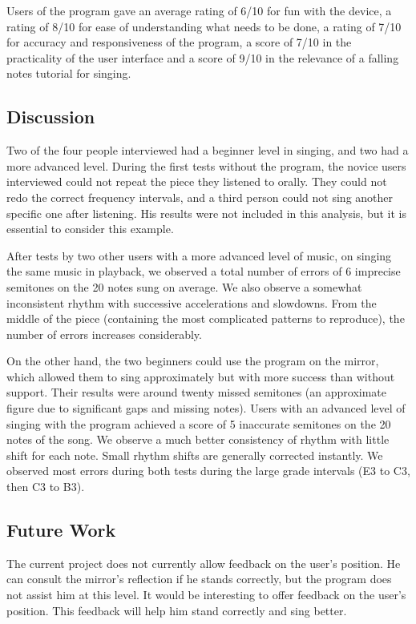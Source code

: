 Users of the program gave an average rating of 6/10 for fun with the device, a rating of 8/10 for ease of understanding what needs to be done, a rating of 7/10 for accuracy and responsiveness of the program, a score of 7/10 in the practicality of the user interface and a score of 9/10 in the relevance of a falling notes tutorial for singing.

\subsection{Discussion}

Two of the four people interviewed had a beginner level in singing, and two had a more advanced level. During the first tests without the program, the novice users interviewed could not repeat the piece they listened to orally. They could not redo the correct frequency intervals, and a third person could not sing another specific one after listening. His results were not included in this analysis, but it is essential to consider this example. 

After tests by two other users with a more advanced level of music, on singing the same music in playback, we observed a total number of errors of 6 imprecise semitones on the 20 notes sung on average. We also observe a somewhat inconsistent rhythm with successive accelerations and slowdowns. From the middle of the piece (containing the most complicated patterns to reproduce), the number of errors increases considerably.

On the other hand, the two beginners could use the program on the mirror, which allowed them to sing approximately but with more success than without support. Their results were around twenty missed semitones (an approximate figure due to significant gaps and missing notes). Users with an advanced level of singing with the program achieved a score of 5 inaccurate semitones on the 20 notes of the song. We observe a much better consistency of rhythm with little shift for each note. 
Small rhythm shifts are generally corrected instantly. We observed most errors during both tests during the large grade intervals (E3 to C3, then C3 to B3).

\subsection{Future Work}

The current project does not currently allow feedback on the user's position. He can consult the mirror's reflection if he stands correctly, but the program does not assist him at this level. It would be interesting to offer feedback on the user's position. This feedback will help him stand correctly and sing better. 

